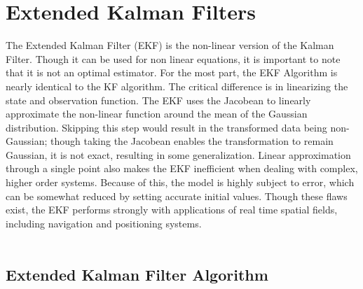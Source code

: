 \chapter{Extended Kalman Filters}
\label{Extended Kalman Filters}

The Extended Kalman Filter (EKF) is the non-linear version of the Kalman Filter. Though it can be used for non linear equations, it is important to note that it is not an optimal estimator. For the most part, the EKF Algorithm is nearly identical to the KF algorithm. The critical difference is in linearizing the state and observation function. The EKF uses the Jacobean to linearly approximate the non-linear function around the mean of the Gaussian distribution. Skipping this step would result in the transformed data being non-Gaussian; though taking the Jacobean enables the transformation to remain Gaussian, it is not exact, resulting in some generalization. Linear approximation through a single point also makes the EKF inefficient when dealing with complex, higher order systems. Because of this, the model is highly subject to error, which can be somewhat reduced by setting accurate initial values. Though these flaws exist, the EKF performs strongly with applications of real time spatial fields, including navigation and positioning systems.  \\ \\

\section{Extended Kalman Filter Algorithm}

